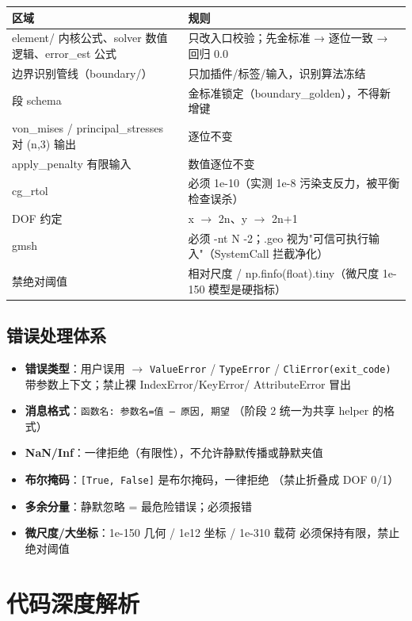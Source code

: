 \documentclass[12pt,a4paper]{ctexart}
\newcommand{\fem}{\Verb}
\begin{document}
\begin{longtable}{p{3.0cm}p{11.8cm}}
\toprule
\textbf{区域} & \textbf{规则} \\
\midrule
element/ 内核公式、solver 数值逻辑、error\_est 公式 & 只改入口校验；先金标准 → 逐位一致 → 回归 0.0 \\
边界识别管线（boundary/） & 只加插件/标签/输入，识别算法冻结 \\
段 schema & 金标准锁定（boundary\_golden），不得新增键 \\
von\_mises / principal\_stresses 对 (n,3) 输出 & 逐位不变 \\
apply\_penalty 有限输入 & 数值逐位不变 \\
cg\_rtol & 必须 1e-10（实测 1e-8 污染支反力，被平衡检查误杀） \\
DOF 约定 & x $\to$ 2n、y $\to$ 2n+1 \\
gmsh & 必须 -nt N -2；.geo 视为"可信可执行输入"（SystemCall 拦截净化） \\
禁绝对阈值 & 相对尺度 / np.finfo(float).tiny（微尺度 1e-150 模型是硬指标） \\
\bottomrule
\end{longtable}

\subsection{错误处理体系}

\begin{itemize}[leftmargin=*]
  \item \textbf{错误类型}：用户误用 $\to$ \fem|ValueError| / \fem|TypeError| /
        \fem|CliError(exit_code)| 带参数上下文；禁止裸 IndexError/KeyError/
        AttributeError 冒出
  \item \textbf{消息格式}：\fem|函数名: 参数名=值 — 原因, 期望|
        （阶段 2 统一为共享 helper 的格式）
  \item \textbf{NaN/Inf}：一律拒绝（有限性），不允许静默传播或静默夹值
  \item \textbf{布尔掩码}：\fem|[True, False]| 是布尔掩码，一律拒绝
        （禁止折叠成 DOF 0/1）
  \item \textbf{多余分量}：静默忽略 = 最危险错误；必须报错
  \item \textbf{微尺度/大坐标}：1e-150 几何 / 1e12 坐标 / 1e-310 载荷
        必须保持有限，禁止绝对阈值
\end{itemize}

\section{代码深度解析}
\end{document}
